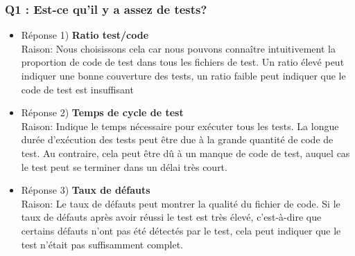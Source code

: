 \documentclass{proc}
\begin{document}
\subsubsection*{Q1 : Est-ce qu'il y a assez de tests?}
\begin{itemize}
    \item Réponse 1) \textbf{Ratio test/code}
    \\Raison:
    Nous choisissons cela car nous pouvons connaître intuitivement la proportion de code de test dans tous les fichiers de test. Un ratio élevé peut indiquer une bonne couverture des tests, un ratio faible peut indiquer que le code de test est insuffisant
    \item Réponse 2) \textbf{Temps de cycle de test}
    \\Raison:
    Indique le temps nécessaire pour exécuter tous les tests. La longue durée d’exécution des tests peut être due à la grande quantité de code de test. Au contraire, cela peut être dû à un manque de code de test, auquel cas le test peut se terminer dans un délai très court.
    \item Réponse 3) \textbf{Taux de défauts}
    \\Raison:
    Le taux de défauts peut montrer la qualité du fichier de code. Si le taux de défauts après avoir réussi le test est très élevé, c'est-à-dire que certains défauts n'ont pas été détectés par le test, cela peut indiquer que le test n'était pas suffisamment complet.
\end{itemize}
\end{document}
